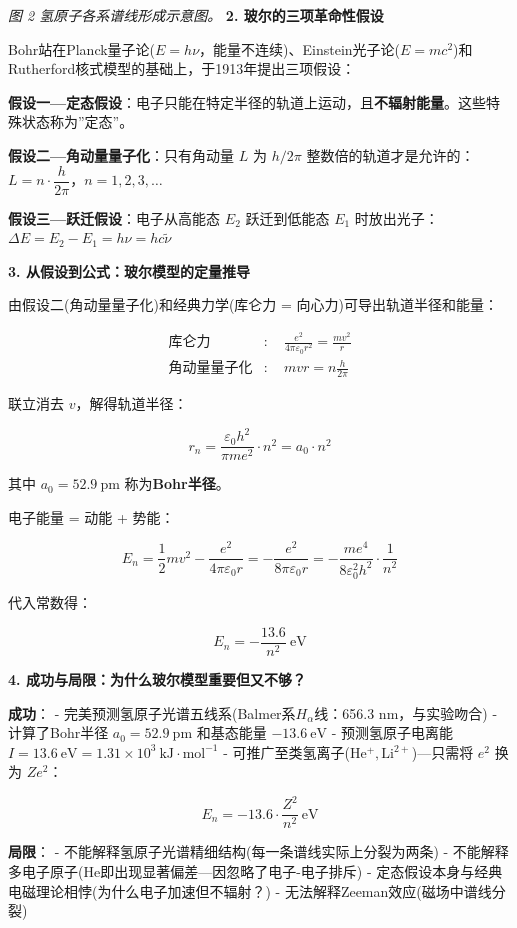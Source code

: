 \emph{图 2 氢原子各系谱线形成示意图。}
\textbf{2. 玻尔的三项革命性假设}

Bohr站在Planck量子论(\(E = h\nu\)，能量不连续)、Einstein光子论(\(E = mc^2\))和Rutherford核式模型的基础上，于1913年提出三项假设：

\textbf{假设一---定态假设}：电子只能在特定半径的轨道上运动，且\textbf{不辐射能量}。这些特殊状态称为''定态''。

\textbf{假设二---角动量量子化}：只有角动量 \(L\) 为 \(h/2\pi\) 整数倍的轨道才是允许的：\(L = n \cdot \dfrac{h}{2\pi}\)，\(n = 1,2,3,\dots\)

\textbf{假设三---跃迁假设}：电子从高能态 \(E_2\) 跃迁到低能态 \(E_1\) 时放出光子：\(\Delta E = E_2 - E_1 = h\nu = hc\tilde{\nu}\)

\textbf{3. 从假设到公式：玻尔模型的定量推导}

由假设二(角动量量子化)和经典力学(库仑力 = 向心力)可导出轨道半径和能量：

\[
\begin{aligned}
\text{库仑力} &: \quad \frac{e^2}{4\pi\varepsilon_0 r^2} = \frac{mv^2}{r} \\
\text{角动量量子化} &: \quad mvr = n\frac{h}{2\pi}
\end{aligned}
\]

联立消去 \(v\)，解得轨道半径：

\[
r_n = \frac{\varepsilon_0 h^2}{\pi m e^2} \cdot n^2 = a_0 \cdot n^2
\]

其中 \(a_0 = 52.9\ \mathrm{pm}\) 称为\textbf{Bohr半径}。

电子能量 = 动能 + 势能：

\[
E_n = \frac{1}{2}mv^2 - \frac{e^2}{4\pi\varepsilon_0 r} = -\frac{e^2}{8\pi\varepsilon_0 r} = -\frac{me^4}{8\varepsilon_0^2 h^2} \cdot \frac{1}{n^2}
\]

代入常数得：

\[
\boxed{E_n = -\frac{13.6}{n^2}\ \mathrm{eV}}
\]

\textbf{4. 成功与局限：为什么玻尔模型重要但又不够？}

\textbf{成功}：
- 完美预测氢原子光谱五线系(Balmer系\(H_\alpha\)线：656.3 nm，与实验吻合)
- 计算了Bohr半径 \(a_0 = 52.9\ \mathrm{pm}\) 和基态能量 \(-13.6\ \mathrm{eV}\)
- 预测氢原子电离能 \(I = 13.6\ \mathrm{eV} = 1.31 \times 10^3\ \mathrm{kJ\cdot mol^{-1}}\)
- 可推广至类氢离子(\(\mathrm{He^+, Li^{2+}}\))---只需将 \(e^2\) 换为 \(Ze^2\)：

\[E_n = -13.6 \cdot \frac{Z^2}{n^2}\ \mathrm{eV}\]

\textbf{局限}：
- 不能解释氢原子光谱精细结构(每一条谱线实际上分裂为两条)
- 不能解释多电子原子(He即出现显著偏差---因忽略了电子-电子排斥)
- 定态假设本身与经典电磁理论相悖(为什么电子加速但不辐射？)
- 无法解释Zeeman效应(磁场中谱线分裂)

